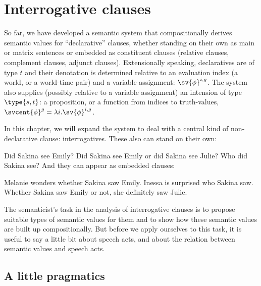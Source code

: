 \providecommand{\ans}{\textsc{ans}\xspace}
\providecommand{\dox}{\textsc{dox}\xspace}
\chapter{Interrogative clauses}\label{cha:interrogatives}

\minitoc

So far, we have developed a semantic system that compositionally derives
semantic values for ``declarative'' clauses, whether standing on their own as
main or matrix sentences or embedded as constituent clauses (relative clauses,
complement clauses, adjunct clauses). Extensionally speaking, declaratives are
of type $t$ and their denotation is determined relative to an evaluation index
(a world, or a world-time pair) and a variable assignment: $\sv{\phi}^{i,g}$.
The system also supplies (possibly relative to a variable assignment) an
intension of type $\type{s,t}$: %
%
a proposition, or a function from indices to truth-values,
$\svcent{\phi}^{g}=\lambda i.\sv{\phi}^{i,g}$.

%
In this chapter, we will expand the system to deal with a central kind of
non-declarative clause: interrogatives. These also can stand on their own:

\pex
\a Did Sakina see Emily?
\a Did Sakina see Emily or did Sakina see Julie?
\a Who did Sakina see?
\xe
%
\kwn And they can appear as embedded clauses:

\pex
\a Melanie wonders whether Sakina saw Emily.
\a Inessa is surprised who Sakina saw.
\a Whether Sakina saw Emily or not, she definitely saw Julie.
\xe

The semanticist's task in the analysis of interrogative clauses is to propose
suitable types of semantic values for them and to show how these semantic values
are built up compositionally. But before we apply ourselves to this task, it is
useful to say a little bit about speech acts, and about the relation between
semantic values and speech acts.

\section{A little pragmatics}
\label{sec:pragmatics}

